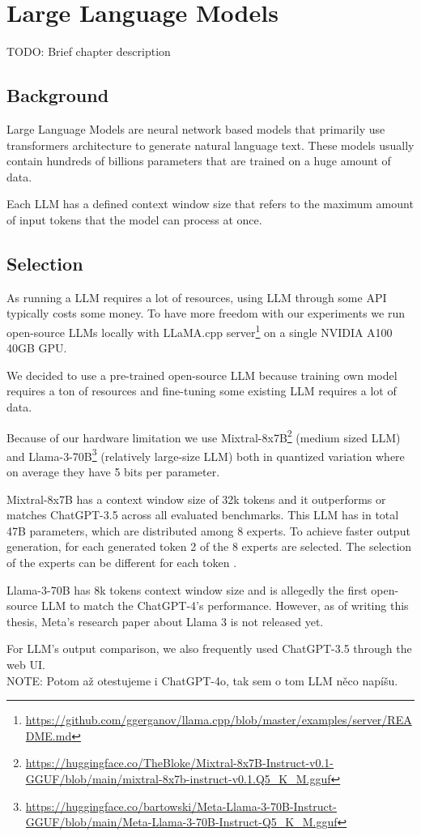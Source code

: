 \chapter{Large Language Models}

TODO: Brief chapter description

\section{Background}
Large Language Models are neural network based models that primarily use transformers architecture \cite{Vaswani2017} to generate natural language text. These models usually contain hundreds of billions parameters that are trained on a huge amount of data.

Each LLM has a defined context window size that refers to the maximum amount of input tokens that the model can process at once.


\section{Selection}

As running a LLM requires a lot of resources, using LLM through some API typically costs some money. To have more freedom with our experiments we run open-source LLMs locally with LLaMA.cpp server\footnote{\url{https://github.com/ggerganov/llama.cpp/blob/master/examples/server/README.md}} on a single NVIDIA A100 40GB GPU.

We decided to use a pre-trained open-source LLM because training own model requires a ton of resources and fine-tuning some existing LLM requires a lot of data.

Because of our hardware limitation we use Mixtral-8x7B\footnote{\url{https://huggingface.co/TheBloke/Mixtral-8x7B-Instruct-v0.1-GGUF/blob/main/mixtral-8x7b-instruct-v0.1.Q5_K_M.gguf}} (medium sized LLM) \cite{Jiang2024} and Llama-3-70B\footnote{\url{https://huggingface.co/bartowski/Meta-Llama-3-70B-Instruct-GGUF/blob/main/Meta-Llama-3-70B-Instruct-Q5_K_M.gguf}} (relatively large-size LLM) both in quantized variation where on average they have 5 bits per parameter.

Mixtral-8x7B has a context window size of 32k tokens and it outperforms or matches ChatGPT-3.5 across all evaluated benchmarks. This LLM has in total 47B parameters, which are distributed among 8 experts. To achieve faster output generation, for each generated token 2 of the 8 experts are selected. The selection of the experts can be different for each token \cite{Jiang2024}.

Llama-3-70B has 8k tokens context window size and is allegedly  the first open-source LLM to match the ChatGPT-4's performance. However, as of writing this thesis, Meta's research paper about Llama 3 is not released yet.

For LLM's output comparison, we also frequently used ChatGPT-3.5 through the web UI. \\

NOTE: Potom až otestujeme i ChatGPT-4o, tak sem o tom LLM něco napíšu.